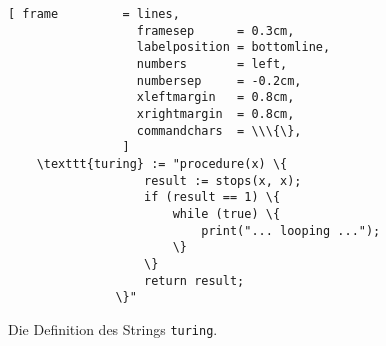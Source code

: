 \begin{figure}[!h]
  \centering
\begin{Verbatim}[ frame         = lines, 
                  framesep      = 0.3cm, 
                  labelposition = bottomline,
                  numbers       = left,
                  numbersep     = -0.2cm,
                  xleftmargin   = 0.8cm,
                  xrightmargin  = 0.8cm,
                  commandchars  = \\\{\},
                ]
    \texttt{turing} := "procedure(x) \{
                   result := stops(x, x);
                   if (result == 1) \{
                       while (true) \{
                           print("... looping ...");
                       \}
                   \}
                   return result;
               \}"
\end{Verbatim}
  \vspace*{-0.3cm}
  \caption{Die Definition des Strings \texttt{turing}.}
  \label{fig:turing-string}
\end{figure}

